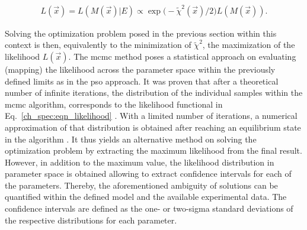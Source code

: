 \begin{align}
 L(\vec{x}) = L(M(\vec{x}) | E) \propto \exp \big(- \tilde{\chi}^2(\vec{x}) / 2 \big) L(M(\vec{x})) \text{.} \label{ch_spec:eqn_likelihood}
\end{align}

Solving the optimization problem posed in the previous section within this context is then, equivalently to the minimization of $\tilde{\chi}^2$, the maximization of the likelihood $L(\vec{x})$. The \gls{mcmc} method poses a statistical approach on evaluating (mapping) the likelihood across the parameter space within the previously defined limits as in the \gls{pso} approach. It was proven that after a theoretical number of infinite iterations, the distribution of the individual samples within the \gls{mcmc} algorithm, corresponds to the likelihood functional in Eq.~\eqref{ch_spec:eqn_likelihood} \cite{cox_theoretical_1979, mackay_information_2003}. With a limited number of iterations, a numerical approximation of that distribution is obtained after reaching an equilibrium state in the algorithm \cite{foreman-mackey_emcee:_2013}. It thus yields an alternative method on solving the optimization problem by extracting the maximum likelihood from the final result. However, in addition to the maximum value, the likelihood distribution in parameter space is obtained allowing to extract confidence intervals for each of the parameters. Thereby, the aforementioned ambiguity of solutions can be quantified within the defined model and the available experimental data. The confidence intervals are defined as the one- or two-sigma standard deviations of the respective distributions for each parameter.

